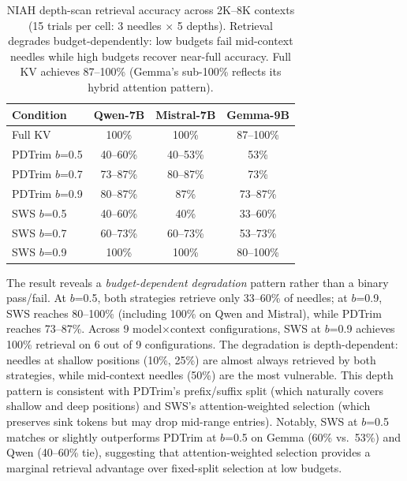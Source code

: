 \documentclass[11pt]{article}
\newcommand{\sws}{SWS}
\newcommand{\pct}{\%}
\theoremstyle{definition}
\theoremstyle{plain}
\begin{document}
\begin{table}[t]
\centering
\caption{NIAH depth-scan retrieval accuracy across 2K--8K contexts (15 trials per cell: 3 needles $\times$ 5 depths).  Retrieval degrades budget-dependently: low budgets fail mid-context needles while high budgets recover near-full accuracy.  Full KV achieves 87--100\pct{} (Gemma's sub-100\pct{} reflects its hybrid attention pattern).}
\label{tab:niah}
\small
\begin{tabular}{lccc}
\toprule
Condition & Qwen-7B & Mistral-7B & Gemma-9B \\
\midrule
Full KV          & 100\pct{} & 100\pct{} & 87--100\pct{} \\
PDTrim $b$=0.5   & 40--60\pct{} & 40--53\pct{} & 53\pct{} \\
PDTrim $b$=0.7   & 73--87\pct{} & 80--87\pct{} & 73\pct{} \\
PDTrim $b$=0.9   & 80--87\pct{} & 87\pct{} & 73--87\pct{} \\
\sws{} $b$=0.5   & 40--60\pct{} & 40\pct{} & 33--60\pct{} \\
\sws{} $b$=0.7   & 60--73\pct{} & 60--73\pct{} & 53--73\pct{} \\
\sws{} $b$=0.9   & 100\pct{} & 100\pct{} & 80--100\pct{} \\
\bottomrule
\end{tabular}
\end{table}

The result reveals a \emph{budget-dependent degradation} pattern rather than a binary pass/fail.  At $b$=0.5, both strategies retrieve only 33--60\pct{} of needles; at $b$=0.9, \sws{} reaches 80--100\pct{} (including 100\pct{} on Qwen and Mistral), while PDTrim reaches 73--87\pct{}.  Across 9 model$\times$context configurations, \sws{} at $b$=0.9 achieves 100\pct{} retrieval on 6 out of 9 configurations.  The degradation is depth-dependent: needles at shallow positions (10\%, 25\%) are almost always retrieved by both strategies, while mid-context needles (50\%) are the most vulnerable.  This depth pattern is consistent with PDTrim's prefix/suffix split (which naturally covers shallow and deep positions) and \sws{}'s attention-weighted selection (which preserves sink tokens but may drop mid-range entries).  Notably, \sws{} at $b$=0.5 matches or slightly outperforms PDTrim at $b$=0.5 on Gemma (60\pct{} vs.\ 53\pct{}) and Qwen (40--60\pct{} tie), suggesting that attention-weighted selection provides a marginal retrieval advantage over fixed-split selection at low budgets.
\end{document}
